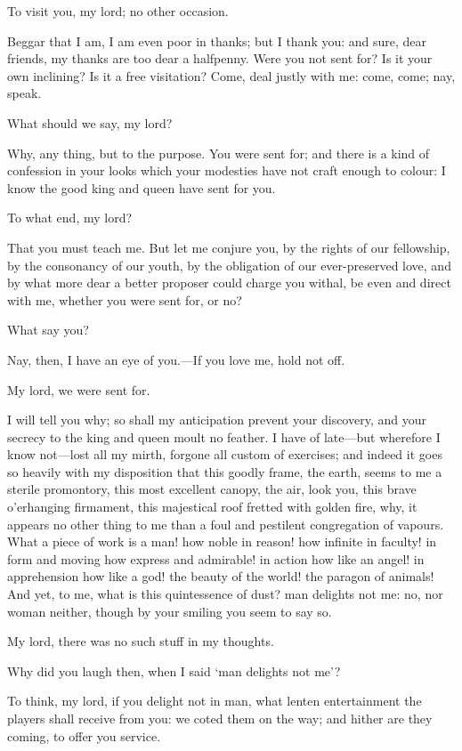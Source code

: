\documentclass[11pt]{book}
\begin{document}
	To visit you, my lord; no other occasion.

\1	Beggar that I am, I am even poor in thanks; but I
	thank you: and sure, dear friends, my thanks are
	too dear a halfpenny. Were you not sent for? Is it
	your own inclining? Is it a free visitation? Come,
	deal justly with me: come, come; nay, speak.

	What should we say, my lord?

\1	Why, any thing, but to the purpose. You were sent
	for; and there is a kind of confession in your looks
	which your modesties have not craft enough to colour:
	I know the good king and queen have sent for you.

	To what end, my lord?

\1	That you must teach me. But let me conjure you, by
	the rights of our fellowship, by the consonancy of
	our youth, by the obligation of our ever-preserved
	love, and by what more dear a better proposer could
	charge you withal, be even and direct with me,
	whether you were sent for, or no?

\aparte{}  What say you?

\aparte\1  Nay, then, I have an eye of you.---If you
	love me, hold not off.

	My lord, we were sent for.

\1	I will tell you why; so shall my anticipation
	prevent your discovery, and your secrecy to the king
	and queen moult no feather. I have of late---but
	wherefore I know not---lost all my mirth, forgone all
	custom of exercises; and indeed it goes so heavily
	with my disposition that this goodly frame, the
	earth, seems to me a sterile promontory, this most
	excellent canopy, the air, look you, this brave
	o'erhanging firmament, this majestical roof fretted
	with golden fire, why, it appears no other thing to
	me than a foul and pestilent congregation of vapours.
	What a piece of work is a man! how noble in reason!
	how infinite in faculty! in form and moving how
	express and admirable! in action how like an angel!
	in apprehension how like a god! the beauty of the
	world! the paragon of animals! And yet, to me,
	what is this quintessence of dust? man delights not
	me: no, nor woman neither, though by your smiling
	you seem to say so.

	My lord, there was no such stuff in my thoughts.

\1	Why did you laugh then, when I said `man delights not me'?

	To think, my lord, if you delight not in man, what
	lenten entertainment the players shall receive from
	you: we coted them on the way; and hither are they
	coming, to offer you service.
\end{document}
